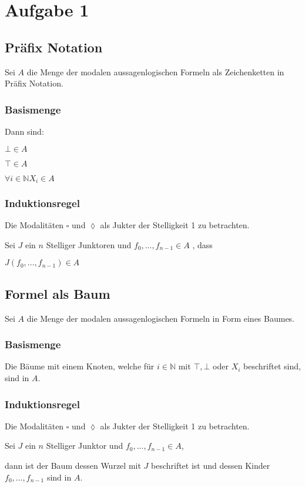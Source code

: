 \section*{Aufgabe 1}

\subsection*{Präfix Notation}

Sei $A$ die Menge der modalen aussagenlogischen Formeln als Zeichenketten in Präfix Notation.


\subsubsection*{Basismenge}

Dann sind:

$\bot \in A$

$\top \in A$

$\forall i \in \mathbb{N} X_i \in A$

\subsubsection*{Induktionsregel}

Die Modalitäten $\square$ und $\lozenge$ als Jukter der Stelligkeit 1 zu betrachten.

Sei $J$ ein $n$ Stelliger Junktoren und $f_0, ... , f_{n-1} \in A$  , dass

$J(f_0, ... , f_{n-1}) \in A$


\subsection*{Formel als Baum}

Sei $A$ die Menge der modalen aussagenlogischen Formeln in Form eines Baumes.

\subsubsection*{Basismenge}

Die Bäume mit einem Knoten, welche für $i \in \mathbb{N}$ mit $\top, \bot$ oder $X_i$ beschriftet sind, sind in $A$.

\subsubsection*{Induktionsregel}

Die Modalitäten $\square$ und $\lozenge$ als Jukter der Stelligkeit 1 zu betrachten.

Sei $J$ ein $n$ Stelliger Junktor und $f_0, ... , f_{n-1} \in A$, 

dann ist der Baum dessen Wurzel mit $J$ beschriftet ist und dessen Kinder $f_0, ... , f_{n-1}$ sind in $A$.
